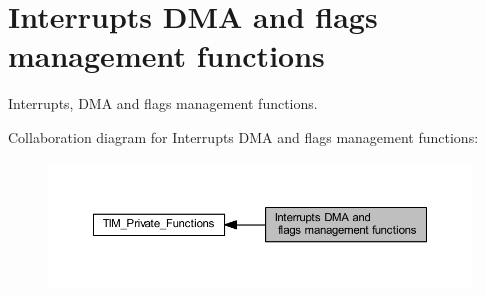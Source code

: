 \hypertarget{group___t_i_m___group5}{}\section{Interrupts D\+MA and flags management functions}
\label{group___t_i_m___group5}


Interrupts, D\+MA and flags management functions.  


Collaboration diagram for Interrupts D\+MA and flags management functions\+:
\nopagebreak
\begin{figure}[H]
\begin{center}
\leavevmode
\includegraphics[width=350pt]{group___t_i_m___group5}
\end{center}
\end{figure}
